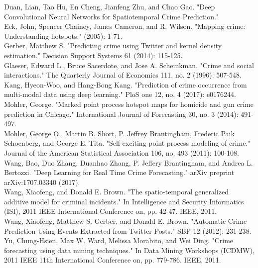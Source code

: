 \documentclass[10pt,journal,compsoc]{IEEEtran}
\begin{document}
\begin{thebibliography}{1}
Duan, Lian, Tao Hu, En Cheng, Jianfeng Zhu, and Chao Gao. "Deep Convolutional Neural
Networks for Spatiotemporal Crime Prediction."\\

Eck, John, Spencer Chainey, James Cameron, and R. Wilson. "Mapping crime: Understanding
hotspots." (2005): 1-71.\\

Gerber, Matthew S. "Predicting crime using Twitter and kernel density estimation." Decision Support Systems 61 (2014): 115-125.\\

Glaeser, Edward L., Bruce Sacerdote, and Jose A. Scheinkman. "Crime and social
interactions." The Quarterly Journal of Economics 111, no. 2 (1996): 507-548.\\

Kang, Hyeon-Woo, and Hang-Bong Kang. "Prediction of crime occurrence from multi-modal
data using deep learning." PloS one 12, no. 4 (2017): e0176244.\\

Mohler, George. "Marked point process hotspot maps for homicide and gun crime prediction in Chicago." International Journal of Forecasting 30, no. 3 (2014): 491-497.\\

Mohler, George O., Martin B. Short, P. Jeffrey Brantingham, Frederic Paik Schoenberg, and
George E. Tita. "Self-exciting point process modeling of crime." Journal of the American
Statistical Association 106, no. 493 (2011): 100-108.\\

Wang, Bao, Duo Zhang, Duanhao Zhang, P. Jeffery Brantingham, and Andrea L. Bertozzi.
"Deep Learning for Real Time Crime Forecasting." arXiv preprint arXiv:1707.03340 (2017).\\

Wang, Xiaofeng, and Donald E. Brown. "The spatio-temporal generalized additive model for
criminal incidents." In Intelligence and Security Informatics (ISI), 2011 IEEE International Conference on, pp. 42-47. IEEE, 2011.\\

Wang, Xiaofeng, Matthew S. Gerber, and Donald E. Brown. "Automatic Crime Prediction Using
Events Extracted from Twitter Posts." SBP 12 (2012): 231-238.\\

Yu, Chung-Hsien, Max W. Ward, Melissa Morabito, and Wei Ding. "Crime forecasting using
data mining techniques." In Data Mining Workshops (ICDMW), 2011 IEEE 11th International
Conference on, pp. 779-786. IEEE, 2011.\\

\end{thebibliography}
\end{document}
